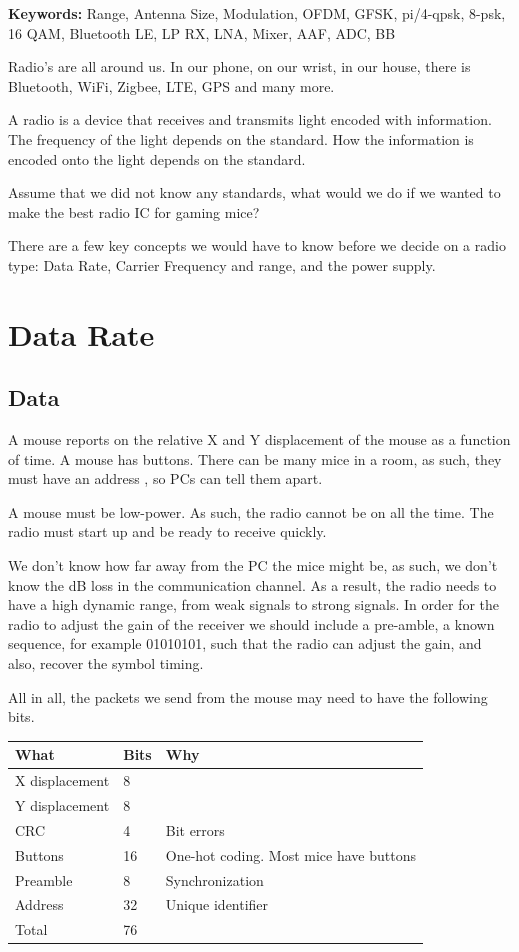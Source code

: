 \textbf{Keywords:} Range, Antenna Size, Modulation, OFDM, GFSK,
pi/4-qpsk, 8-psk, 16 QAM, Bluetooth LE, LP RX, LNA, Mixer, AAF, ADC, BB

Radio's are all around us. In our phone, on our wrist, in our house,
there is Bluetooth, WiFi, Zigbee, LTE, GPS and many more.

A radio is a device that receives and transmits light encoded with
information. The frequency of the light depends on the standard. How the
information is encoded onto the light depends on the standard.

Assume that we did not know any standards, what would we do if we wanted
to make the best radio IC for gaming mice?

There are a few key concepts we would have to know before we decide on a
radio type: Data Rate, Carrier Frequency and range, and the power
supply.

\section{Data Rate}\label{data-rate}

\subsection{Data}\label{data}

A mouse reports on the relative X and Y displacement of the mouse as a
function of time. A mouse has buttons. There can be many mice in a room,
as such, they must have an address , so PCs can tell them apart.

A mouse must be low-power. As such, the radio cannot be on all the time.
The radio must start up and be ready to receive quickly.

We don't know how far away from the PC the mice might be, as such, we
don't know the dB loss in the communication channel. As a result, the
radio needs to have a high dynamic range, from weak signals to strong
signals. In order for the radio to adjust the gain of the receiver we
should include a pre-amble, a known sequence, for example 01010101, such
that the radio can adjust the gain, and also, recover the symbol timing.

All in all, the packets we send from the mouse may need to have the
following bits.

\begin{longtable}[]{@{}lll@{}}
\toprule\noalign{}
What & Bits & Why \\
\midrule\noalign{}
\endhead
\bottomrule\noalign{}
\endlastfoot
X displacement & 8 & \\
Y displacement & 8 & \\
CRC & 4 & Bit errors \\
Buttons & 16 & One-hot coding. Most mice have buttons \\
Preamble & 8 & Synchronization \\
Address & 32 & Unique identifier \\
Total & 76 & \\
\end{longtable}

